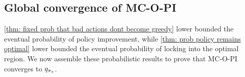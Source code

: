 




\subsection{Global convergence of MC-O-PI}

\autoref{thm: fixed prob that bad actions dont become greedy} lower bounded the eventual probability of policy improvement,
while \autoref{thm: prob policy remains optimal} lower bounded the eventual probability of locking into the optimal region.
We now assemble these probabilistic results to prove that MC-O-PI converges to $q_{{\pi}_*}$.


